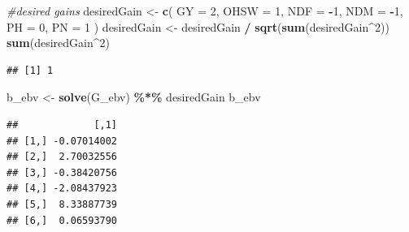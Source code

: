 \documentclass[
  12pt,
]{article}
\newenvironment{Shaded}{\begin{snugshade}}{\end{snugshade}}
\newcommand{\AttributeTok}[1]{\textcolor[rgb]{0.13,0.29,0.53}{#1}}
\newcommand{\CommentTok}[1]{\textcolor[rgb]{0.56,0.35,0.01}{\textit{#1}}}
\newcommand{\DecValTok}[1]{\textcolor[rgb]{0.00,0.00,0.81}{#1}}
\newcommand{\FunctionTok}[1]{\textcolor[rgb]{0.13,0.29,0.53}{\textbf{#1}}}
\newcommand{\NormalTok}[1]{#1}
\newcommand{\OtherTok}[1]{\textcolor[rgb]{0.56,0.35,0.01}{#1}}
\newcommand{\SpecialCharTok}[1]{\textcolor[rgb]{0.81,0.36,0.00}{\textbf{#1}}}
\begin{document}
\begin{Shaded}
\begin{Highlighting}[]
\CommentTok{\#desired gains}
\NormalTok{desiredGain }\OtherTok{\textless{}{-}} \FunctionTok{c}\NormalTok{(}
  \AttributeTok{GY   =}  \DecValTok{2}\NormalTok{,}
  \AttributeTok{OHSW =}  \DecValTok{1}\NormalTok{,}
  \AttributeTok{NDF  =} \SpecialCharTok{{-}}\DecValTok{1}\NormalTok{,}
  \AttributeTok{NDM  =} \SpecialCharTok{{-}}\DecValTok{1}\NormalTok{,}
  \AttributeTok{PH   =}  \DecValTok{0}\NormalTok{,}
  \AttributeTok{PN   =}  \DecValTok{1}
\NormalTok{)}
\NormalTok{desiredGain }\OtherTok{\textless{}{-}}\NormalTok{ desiredGain }\SpecialCharTok{/} \FunctionTok{sqrt}\NormalTok{(}\FunctionTok{sum}\NormalTok{(desiredGain}\SpecialCharTok{\^{}}\DecValTok{2}\NormalTok{))}
\FunctionTok{sum}\NormalTok{(desiredGain}\SpecialCharTok{\^{}}\DecValTok{2}\NormalTok{)}
\end{Highlighting}
\end{Shaded}

\begin{verbatim}
## [1] 1
\end{verbatim}

\begin{Shaded}
\begin{Highlighting}[]
\NormalTok{b\_ebv }\OtherTok{\textless{}{-}} \FunctionTok{solve}\NormalTok{(G\_ebv) }\SpecialCharTok{\%*\%}\NormalTok{ desiredGain}
\NormalTok{b\_ebv}
\end{Highlighting}
\end{Shaded}

\begin{verbatim}
##             [,1]
## [1,] -0.07014002
## [2,]  2.70032556
## [3,] -0.38420756
## [4,] -2.08437923
## [5,]  8.33887739
## [6,]  0.06593790
\end{verbatim}

\begin{Shaded}
\end{Shaded}
\end{document}
